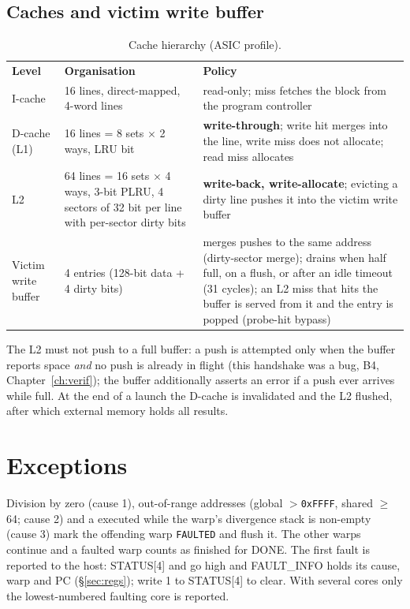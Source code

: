 \documentclass[10pt,a4paper]{report}
\newcommand{\sig}[1]{\texttt{\detokenize{#1}}}
\newcommand{\ins}[1]{\texttt{\detokenize{#1}}}
\newcommand{\rowcol}{\rowcolors{2}{rowgray}{white}}
\newcommand{\tblhead}[1]{\cellcolor{hdrgray}\sffamily\bfseries #1}
\begin{document}
\subsection{Caches and victim write buffer}
\begin{table}[ht]\centering\rowcol
\begin{tabular}{@{}p{2.6cm}p{5.0cm}p{8.1cm}@{}}
\tblhead{Level} & \tblhead{Organisation} & \tblhead{Policy}\\
I-cache & 16 lines, direct-mapped, 4-word lines & read-only; miss fetches the block from the program controller\\
D-cache (L1) & 16 lines = 8 sets $\times$ 2 ways, LRU bit & \textbf{write-through}; write hit merges into the line, write miss does not allocate; read miss allocates\\
L2 & 64 lines = 16 sets $\times$ 4 ways, 3-bit PLRU, 4 sectors of 32 bit per line with per-sector dirty bits & \textbf{write-back, write-allocate}; evicting a dirty line pushes it into the victim write buffer\\
Victim write buffer & 4 entries (128-bit data + 4 dirty bits) & merges pushes to the same address (dirty-sector merge); drains when half full, on a flush, or after an idle timeout (31 cycles); an L2 miss that hits the buffer is served from it and the entry is popped (probe-hit bypass)\\
\bottomrule
\end{tabular}
\caption{Cache hierarchy (ASIC profile).}
\end{table}
The L2 must not push to a full buffer: a push is attempted only when the buffer reports space \emph{and} no push is already in flight
(this handshake was a bug, B4, Chapter~\ref{ch:verif}); the buffer additionally asserts an error if a push ever arrives while full.
At the end of a launch the D-cache is invalidated and the L2 flushed, after which external memory holds all results.

\section{Exceptions}
Division by zero (cause 1), out-of-range addresses (global $>$\texttt{0xFFFF}, shared $\ge$64; cause 2) and a \ins{SYNC} executed while the
warp's divergence stack is non-empty (cause 3) mark the offending warp \texttt{FAULTED} and flush it. The other warps continue and a faulted warp
counts as finished for DONE. The first fault is reported to the host: STATUS[4] and \sig{gpu_fault_pin} go high and FAULT\_INFO holds its
cause, warp and PC (\S\ref{sec:regs}); write 1 to STATUS[4] to clear. With several cores only the lowest-numbered faulting core is reported.
\end{document}
